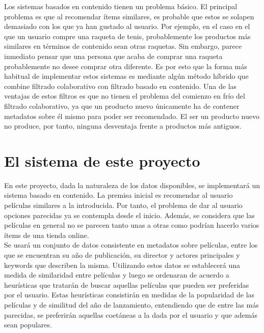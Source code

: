 Los sistemas basados en contenido tienen un problema básico. El principal problema es que al recomendar ítems similares, es probable que estos se solapen demasiado con los que ya han gustado al usuario. Por ejemplo, en el caso en el que un usuario compre una raqueta de tenis, probablemente los productos más similares en términos de contenido sean otras raquetas. Sin embargo, parece inmediato pensar que una persona que acaba de comprar una raqueta probablemente no desee comprar otra diferente. Es por esto que la forma más habitual de implementar estos sistemas es mediante algún método híbrido que combine filtrado colaborativo con filtrado basado en contenido. Una de las ventajas de estos filtros es que no tienen el problema del comienzo en frío del filtrado colaborativo, ya que un producto nuevo únicamente ha de contener metadatos sobre él mismo para poder ser recomendado. El ser un producto nuevo no produce, por tanto, ninguna desventaja frente a productos más antiguos.\\

\section{El sistema de este proyecto}

En este proyecto, dada la naturaleza de los datos disponibles, se implementará un sistema basado en contenido. La premisa inicial es recomendar al usuario películas similares a la introducida. Por tanto, el problema de dar al usuario opciones parecidas ya se contempla desde el inicio. Además, se considera que las películas en general no se parecen tanto unas a otras como podrían hacerlo varios ítems de una tienda online.\\

Se usará un conjunto de datos consistente en metadatos sobre películas, entre los que se encuentran su año de publicación, su director y actores principales y keywords que describen la misma. Utilizando estos datos se establecerá una medida de similaridad entre películas y luego se ordenaran de acuerdo a heurísticas que tratarán de buscar aquellas películas que pueden ser preferidas por el usuario. Estas heurísticas consistirán en medidas de la popularidad de las películas y de similitud del año de lanzamiento, entendiendo que de entre las más parecidas, se preferirán aquellas coetáneas a la dada por el usuario y que además sean populares.


